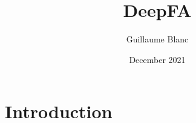 \documentclass{article}
\title{DeepFA}
\author{Guillaume Blanc}
\date{December 2021}
\begin{document}
\maketitle

\section{Introduction}
\end{document}
